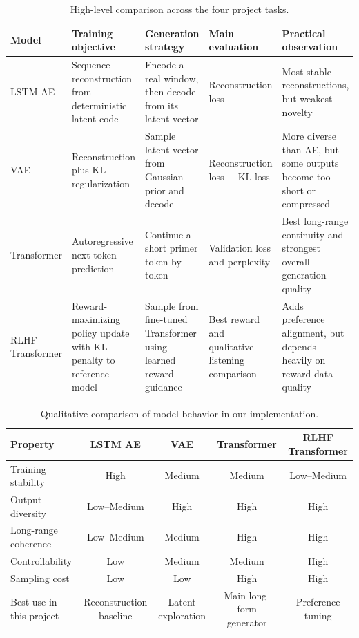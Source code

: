 \documentclass{article}
\begin{document}
\begin{table}[h]
\centering
\small
\begin{tabular}{p{2.1cm}p{2.9cm}p{2.8cm}p{2.3cm}p{3.0cm}}
\toprule
Model & Training objective & Generation strategy & Main evaluation & Practical observation \\
\midrule
LSTM AE & Sequence reconstruction from deterministic latent code & Encode a real window, then decode from its latent vector & Reconstruction loss & Most stable reconstructions, but weakest novelty \\
VAE & Reconstruction plus KL regularization & Sample latent vector from Gaussian prior and decode & Reconstruction loss + KL loss & More diverse than AE, but some outputs become too short or compressed \\
Transformer & Autoregressive next-token prediction & Continue a short primer token-by-token & Validation loss and perplexity & Best long-range continuity and strongest overall generation quality \\
RLHF Transformer & Reward-maximizing policy update with KL penalty to reference model & Sample from fine-tuned Transformer using learned reward guidance & Best reward and qualitative listening comparison & Adds preference alignment, but depends heavily on reward-data quality \\
\bottomrule
\end{tabular}
\caption{High-level comparison across the four project tasks.}
\label{tab:cross_task_compare}
\end{table}

\begin{table}[h]
\centering
\small
\begin{tabular}{lcccc}
\toprule
Property & LSTM AE & VAE & Transformer & RLHF Transformer \\
\midrule
Training stability & High & Medium & Medium & Low--Medium \\
Output diversity & Low--Medium & High & High & High \\
Long-range coherence & Low--Medium & Medium & High & High \\
Controllability & Low & Medium & Medium & High \\
Sampling cost & Low & Low & High & High \\
Best use in this project & Reconstruction baseline & Latent exploration & Main long-form generator & Preference tuning \\
\bottomrule
\end{tabular}
\caption{Qualitative comparison of model behavior in our implementation.}
\label{tab:qualitative_compare}
\end{table}
\end{document}

